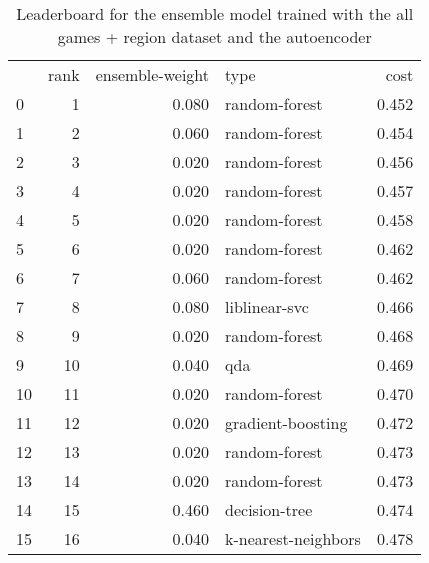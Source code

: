 \begin{table}[]
	\centering
	\begin{tabular}{lrrlr}
		   & rank & ensemble-weight & type                & cost  \\
		0  & 1    & 0.080           & random-forest       & 0.452 \\
		1  & 2    & 0.060           & random-forest       & 0.454 \\
		2  & 3    & 0.020           & random-forest       & 0.456 \\
		3  & 4    & 0.020           & random-forest       & 0.457 \\
		4  & 5    & 0.020           & random-forest       & 0.458 \\
		5  & 6    & 0.020           & random-forest       & 0.462 \\
		6  & 7    & 0.060           & random-forest       & 0.462 \\
		7  & 8    & 0.080           & liblinear-svc       & 0.466 \\
		8  & 9    & 0.020           & random-forest       & 0.468 \\
		9  & 10   & 0.040           & qda                 & 0.469 \\
		10 & 11   & 0.020           & random-forest       & 0.470 \\
		11 & 12   & 0.020           & gradient-boosting   & 0.472 \\
		12 & 13   & 0.020           & random-forest       & 0.473 \\
		13 & 14   & 0.020           & random-forest       & 0.473 \\
		14 & 15   & 0.460           & decision-tree       & 0.474 \\
		15 & 16   & 0.040           & k-nearest-neighbors & 0.478 \\
	\end{tabular}

	\caption{Leaderboard for the ensemble model trained with the all games + region dataset and the autoencoder}
	\label{tab:lb-all-games-with-region-autoencode}
\end{table}

